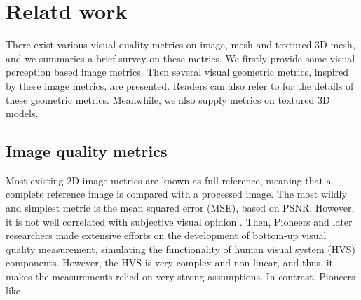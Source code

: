 \section{Relatd work}
There exist various visual quality metrics on image, mesh and textured 3D mesh, and we summaries a brief survey on these metrics. We firstly provide some visual perception based image metrics. Then several visual geometric metrics, inspired by these image metrics, are presented. Readers can also refer to \cite{Corsini_2013} for the details of these geometric metrics.  Meanwhile, we also supply metrics on textured 3D models. 
\subsection{Image quality metrics}
Most existing 2D image metrics are known as full-reference, meaning that a complete reference image is compared with a processed image.  The most wildly and simplest metric is the mean squared error (MSE), based on PSNR. However, it is not well correlated with subjective visual opinion \cite{Snyder_1985} \cite{Teo}. Then, Pioneers \cite{Mannos_1974}  and later researchers made extensive efforts on the development of bottom-up visual quality measurement, simulating the functionality of human visual system (HVS) components. However, the HVS is very complex and non-linear, and thus, it makes the measurements relied on very strong assumptions. In contrast, Pioneers like

